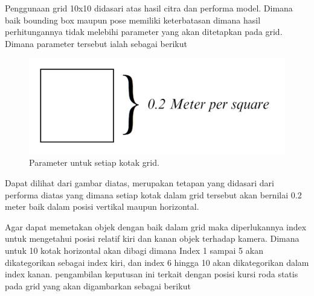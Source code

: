 Penggunaan grid 10x10 didasari atas hasil citra dan performa model. Dimana baik bounding box maupun pose memiliki keterbatasan dimana hasil perhitungannya tidak melebihi parameter yang akan ditetapkan pada grid. Dimana parameter tersebut ialah sebagai berikut

\begin{figure}[H]
  \centering
  \includegraphics[scale=0.35]{gambar/02meter.jpg}
  \caption{Parameter untuk setiap kotak grid.}
  \label{fig:Parameter grid}
\end{figure}

Dapat dilihat dari gambar diatas, merupakan tetapan yang didasari dari performa diatas yang dimana setiap kotak dalam grid tersebut akan bernilai 0.2 meter baik dalam posisi vertikal maupun horizontal.

Agar dapat memetakan objek dengan baik dalam grid maka diperlukannya index untuk mengetahui posisi relatif kiri dan kanan objek terhadap kamera. Dimana untuk 10 kotak horizontal akan dibagi dimana Index 1 sampai 5 akan dikategorikan sebagai index kiri, dan index 6 hingga 10 akan dikategorikan dalam index kanan. pengambilan keputusan ini terkait dengan posisi kursi roda statis pada grid yang akan digambarkan sebagai berikut

